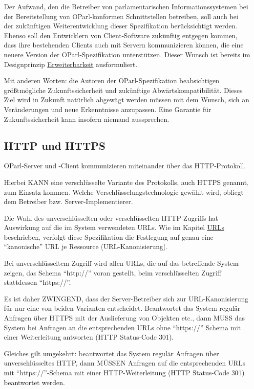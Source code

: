 \documentclass[,a4paper]{article}
\begin{document}
Der Aufwand, den die Betreiber von parlamentarischen
Informationssystemen bei der Bereitstellung von OParl-konformen
Schnittstellen betreiben, soll auch bei der zukünftigen
Weiterentwicklung dieser Spezifikation berücksichtigt werden. Ebenso
soll den Entwicklern von Client-Software zukünftig entgegen kommen, dass
ihre bestehenden Clients auch mit Servern kommunizieren können, die eine
neuere Version der OParl-Spezifikation unterstützen. Dieser Wunsch ist
bereits im Designprinzip \hyperref[erweiterbarkeit]{Erweiterbarkeit}
ausformuliert.

Mit anderen Worten: die Autoren der OParl-Spezifikation beabsichtigen
größtmögliche Zukunftssicherheit und zukünftige Abwärtskompatibilität.
Dieses Ziel wird in Zukunft natürlich abgewägt werden müssen mit dem
Wunsch, sich an Veränderungen und neue Erkenntnisse anzupassen. Eine
Garantie für Zukunftssicherheit kann insofern niemand aussprechen.

\subsection{HTTP und HTTPS}

OParl-Server und -Client kommunizieren miteinander über das
HTTP-Protokoll.

Hierbei KANN eine verschlüsselte Variante des Protokolls, auch HTTPS
genannt, zum Einsatz kommen. Welche Verschlüsselungstechnologie gewählt
wird, obliegt dem Betreiber bzw. Server-Implementierer.

Die Wahl des unverschlüsselten oder verschlüsselten HTTP-Zugriffs hat
Auswirkung auf die im System verwendeten URLs. Wie im Kapitel
\hyperref[urls]{URLs} beschrieben, verfolgt diese Spezifikation die
Festlegung auf genau eine ``kanonische'' URL je Ressource
(URL-Kanonisierung).

Bei unverschlüsseltem Zugriff wird allen URLs, die auf das betreffende
System zeigen, das Schema ``http://'' voran gestellt, beim
verschlüsselten Zugriff stattdessen ``https://''.

Es ist daher ZWINGEND, dass der Server-Betreiber sich zur
URL-Kanonisierung für nur eine von beiden Varianten entscheidet.
Beantwortet das System regulär Anfragen über HTTPS mit der Auslieferung
von Objekten etc., dann MUSS das System bei Anfragen an die
entsprechenden URLs ohne ``https://'' Schema mit einer Weiterleitung
antworten (HTTP Status-Code 301).

Gleiches gilt umgekehrt: beantwortet das System regulär Anfragen über
unverschlüsseltes HTTP, dann MÜSSEN Anfragen auf die entsprechenden URLs
mit ``https://''-Schema mit einer HTTP-Weiterleitung (HTTP Status-Code
301) beantwortet werden.
\end{document}
